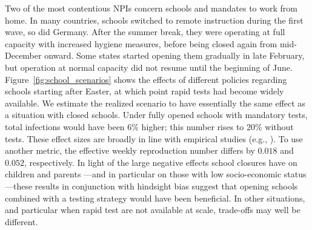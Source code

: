 \documentclass[12pt]{article}
\begin{document}
Two of the most contentious NPIs concern schools and mandates to work from home. In many
countries, schools switched to remote instruction during the first wave, so did Germany.
After the summer break, they were operating at full capacity with increased hygiene
measures, before being closed again from mid-December onward. Some states started
opening them gradually in late February, but operation at normal capacity did not resume
until the beginning of June. Figure~\ref{fig:school_scenarios} shows the effects of
different policies regarding schools starting after Easter, at which point rapid tests
had become widely available. We estimate the realized scenario to have essentially the
same effect as a situation with closed schools. Under fully opened schools with
mandatory tests, total infections would have been 6\% higher; this number rises to 20\%
without tests. These effect sizes are broadly in line with empirical studies (e.g.,
\cite{Vlachos2021}). To use another metric, the effective weekly reproduction number
differs by $0.018$ and $0.052$, respectively. In light of the large negative effects
school closures have on children and parents \cite{Luijten2021, Melegari2021}---and in
particular on those with low socio-economic status---these results in conjunction with
hindsight bias suggest that opening schools combined with a testing strategy would have
been beneficial. In other situations, and particular when rapid test are not available
at scale, trade-offs may well be different.
\end{document}
